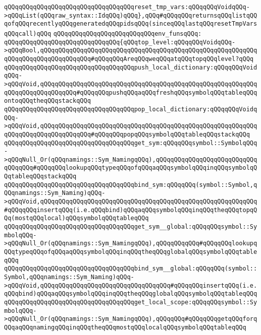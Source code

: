 \verb|qQQqqQQqqQQqqQQqqQQqqQQqqQQqqQQqqQQqreset_tmp_vars:qQQqqQQqVoidqQQq->qQQqList(qQQqraw_syntax::IdqQQq)qQQq},qQQq#qQQqqQQqreturnsqQQqlistqQQqofqQQqrecentlyqQQqgeneratedqQQqpidsqQQq(sinceqQQqlastqQQqresetTmpVarsqQQqcall)qQQq|\newline
\newline
\verb|qQQqqQQqqQQqqQQqqQQqqQQqqQQqenv_funsqQQq:|\newline
\verb|qQQqqQQqqQQqqQQqqQQqqQQqqQQqqQQq{qQQqtop_level:qQQqqQQqVoidqQQq->qQQqBool,qQQqqQQqqQQqqQQqqQQqqQQqqQQqqQQqqQQqqQQqqQQqqQQqqQQqqQQqqQQqqQQqqQQqqQQqqQQqqQQqqQQq#qQQqqQQqAreqQQqweqQQqatqQQqtopqQQqlevel?qQQq|\newline
\verb|qQQqqQQqqQQqqQQqqQQqqQQqqQQqqQQqqQQqpush_local_dictionary:qQQqqQQqVoidqQQq->qQQqVoid,qQQqqQQqqQQqqQQqqQQqqQQqqQQqqQQqqQQqqQQqqQQqqQQqqQQqqQQqqQQqqQQqqQQqqQQqqQQqqQQq#qQQqqQQqpushqQQqaqQQqfreshqQQqsymbolqQQqtableqQQqontoqQQqtheqQQqstackqQQq|\newline
\verb|qQQqqQQqqQQqqQQqqQQqqQQqqQQqqQQqqQQqpop_local_dictionary:qQQqqQQqVoidqQQq->qQQqVoid,qQQqqQQqqQQqqQQqqQQqqQQqqQQqqQQqqQQqqQQqqQQqqQQqqQQqqQQqqQQqqQQqqQQqqQQqqQQqqQQqqQQq#qQQqqQQqpopqQQqsymbolqQQqtableqQQqstackqQQq|\newline
\verb|qQQqqQQqqQQqqQQqqQQqqQQqqQQqqQQqqQQqget_sym:qQQqqQQqsymbol::SymbolqQQq->qQQqNull_Or(qQQqnamings::Sym_NamingqQQq),qQQqqQQqqQQqqQQqqQQqqQQqqQQqqQQqqQQq#qQQqqQQqlookupqQQqtypeqQQqofqQQqaqQQqsymbolqQQqinqQQqsymbolqQQqtableqQQqstackqQQq|\newline
\verb|qQQqqQQqqQQqqQQqqQQqqQQqqQQqqQQqqQQqbind_sym:qQQqqQQq(symbol::Symbol,qQQqnamings::Sym_Naming)qQQq->qQQqVoid,qQQqqQQqqQQqqQQqqQQqqQQqqQQqqQQqqQQqqQQqqQQqqQQqqQQqqQQqqQQq#qQQqqQQqinsertqQQq(i.e.qQQqbind)qQQqaqQQqsymbolqQQqinqQQqtheqQQqtopqQQq(mostqQQqlocal)qQQqsymbolqQQqtableqQQq|\newline
\verb|qQQqqQQqqQQqqQQqqQQqqQQqqQQqqQQqqQQqget_sym__global:qQQqqQQqsymbol::SymbolqQQq->qQQqNull_Or(qQQqnamings::Sym_NamingqQQq),qQQqqQQqqQQq#qQQqqQQqlookupqQQqtypeqQQqofqQQqaqQQqsymbolqQQqinqQQqtheqQQqglobalqQQqsymbolqQQqtableqQQq|\newline
\verb|qQQqqQQqqQQqqQQqqQQqqQQqqQQqqQQqqQQqbind_sym__global:qQQqqQQq(symbol::Symbol,qQQqnamings::Sym_Naming)qQQq->qQQqVoid,qQQqqQQqqQQqqQQqqQQqqQQqqQQqqQQqqQQq#qQQqqQQqinsertqQQq(i.e.qQQqbind)qQQqaqQQqsymbolqQQqinqQQqtheqQQqglobalqQQqsymbolqQQqtableqQQq|\newline
\verb|qQQqqQQqqQQqqQQqqQQqqQQqqQQqqQQqqQQqget_local_scope:qQQqqQQqsymbol::SymbolqQQq->qQQqNull_Or(qQQqnamings::Sym_NamingqQQq),qQQqqQQq#qQQqqQQqgetqQQqforqQQqaqQQqnamingqQQqinqQQqtheqQQqmostqQQqlocalqQQqsymbolqQQqtableqQQq|\newline
